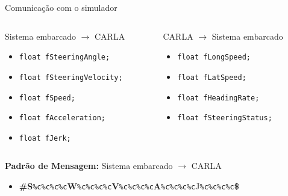 \documentclass{if-beamer}
\begin{document}
\begin{frame}{Comunicação com o simulador}
	
	\begin{columns}
		
		\begin{column}{0.435\textwidth}
			
			\begin{block}{Sistema embarcado $\longrightarrow$ CARLA}
				
				\begin{itemize}
					\item \texttt{float fSteeringAngle;}
					\item \texttt{float fSteeringVelocity;}
					\item \texttt{float fSpeed;}
					\item \texttt{float fAcceleration;}
					\item \texttt{float fJerk;}					
				\end{itemize}
				
			\end{block}
			
		\end{column}
		
		\begin{column}{0.435\textwidth}
			
			\begin{block}{CARLA $\longrightarrow$ Sistema embarcado }
				
				\begin{itemize}
					\item \texttt{float fLongSpeed;}
					\item \texttt{float fLatSpeed;}
					\item \texttt{float fHeadingRate;}
					\item \texttt{float fSteeringStatus;}
					
				\end{itemize}
			
				
				
			\end{block}
			
		\end{column}
		
	\end{columns}

	\begin{block}{}
		
		\textbf{Padrão de Mensagem:} Sistema embarcado $\longrightarrow$ CARLA
		
		\begin{itemize}
			\item \textbf{\#S}\texttt{\%c\%c\%c\%c}\textbf{W}\texttt{\%c\%c\%c\%c}\textbf{V}\texttt{\%c\%c\%c\%c}\textbf{A}\texttt{\%c\%c\%c\%c}J\texttt{\%c\%c\%c\%c}\textbf{\$}
			

\end{itemize}
\end{block}
\end{frame}
\end{document}
